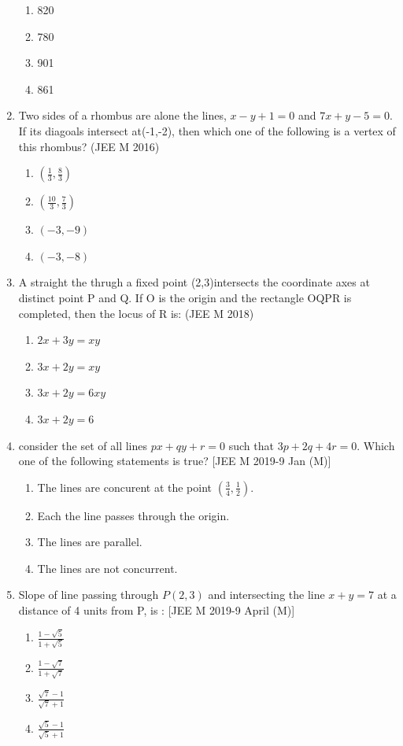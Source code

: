 \documentclass[12pt]{article}
\providecommand{\brak}[1]{\ensuremath{\left(#1\right)}}
\begin{document}
\begin{enumerate}
\begin{enumerate}
\item 820 
\item 780 
\item 901 
\item 861
\end{enumerate}
\item Two sides  of a rhombus are alone the lines, $x-y+1=0$ and $7x+y-5=0$. If its diagoals intersect at(-1,-2), then which one of the following is a vertex of this rhombus? (JEE M 2016)
\begin{enumerate}
\item $\brak{\frac{1}{3},\frac{8}{3}}$ 
\item $\brak{\frac{10}{3},\frac{7}{3}}$ 
\item $\brak{-3,-9}$ 
\item $\brak{-3,-8}$
\end{enumerate}
\item A straight the thrugh a fixed point (2,3)intersects the coordinate axes at distinct point P  and Q. If O is the origin and the rectangle OQPR is completed, then the locus of R is: (JEE M 2018)
\begin{enumerate}
\item $2x+3y=xy$ 
\item $3x+2y=xy$ 
\item $3x+2y=6xy$ 
\item $3x+2y=6$
\end{enumerate}
\item consider the set of all lines $px+qy+r=0$ such that $3p+2q+4r=0$. Which one of the following statements is true? [JEE M 2019-9 Jan (M)]
\begin{enumerate}
\item The lines are concurent at the point $\brak{\frac{3}{4},\frac{1}{2}} $.
\item Each the line passes through the origin.
\item The lines are parallel.
\item The lines are not concurrent.
\end{enumerate}
\item Slope of line passing through $P(2,3)$ and intersecting the line $x+y=7$ at a distance of 4 units from  P,  is : [JEE M 2019-9 April (M)]
\begin{enumerate}
\item $\frac{1-\sqrt{5}}{1+\sqrt{5}}$
\item $\frac{1-\sqrt{7}}{1+\sqrt{7}}$
\item $\frac{\sqrt{7}-1}{\sqrt{7}+1}$
\item $\frac{\sqrt{5}-1}{\sqrt{5}+1}$
\end{enumerate}
\end{enumerate}
\iffalse
\end{document}

